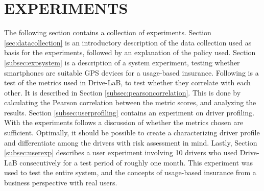 \section{EXPERIMENTS}\label{sec:experiments}

The following section contains a collection of experiments. Section \ref{sec:datacollection} is an introductory description of the data collection used as basis for the experiments, followed by an explanation of the policy used. Section \ref{subsec:expsystem} is a description of a system experiment, testing whether smartphones are suitable GPS devices for a usage-based insurance. Following is a test of the metrics used in Drive-LaB, to test whether they correlate with each other. It is described in Section \ref{subsec:pearsoncorrelation}. This is done by calculating the Pearson correlation between the metric scores, and analyzing the results. Section \ref{subsec:userprofiling} contains an experiment on driver profiling. With the experiments follows a discussion of whether the metrics chosen are sufficient. Optimally, it should be possible to create a characterizing driver profile and differentiate among the drivers with risk assessment in mind. Lastly, Section \ref{subsec:userexp} describes a user experiment involving 10 drivers who used Drive-LaB consecutively for a test period of roughly one month. This experiment was used to test the entire system, and the concepts of usage-based insurance from a business perspective with real users.



